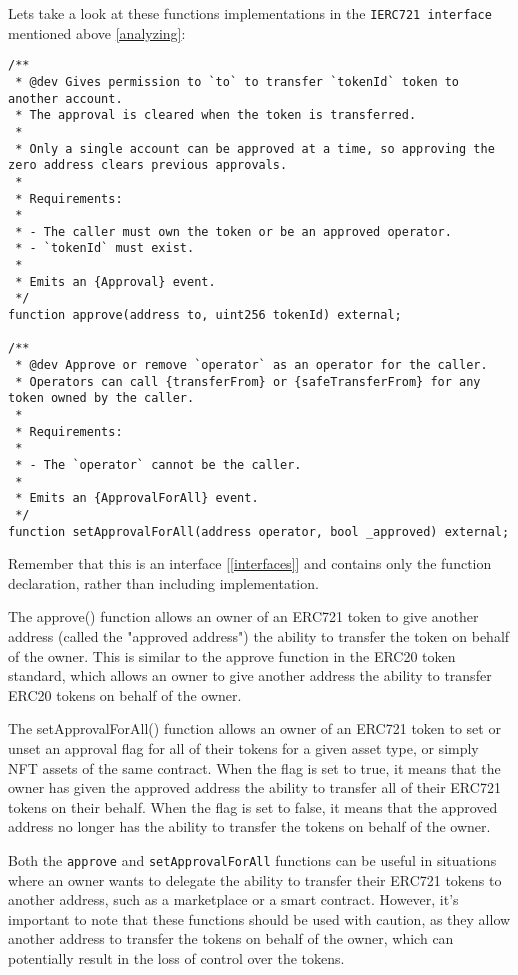 \documentclass{article}
\theoremstyle{theorem}
\theoremstyle{definition}
\theoremstyle{remark}
\begin{document}
\medskip\noindent
Lets take a look at these functions implementations in the \texttt{IERC721 interface} mentioned above \ref{analyzing}:

\begin{itemize}
\begin{lstlisting}
/**
 * @dev Gives permission to `to` to transfer `tokenId` token to another account.
 * The approval is cleared when the token is transferred.
 *
 * Only a single account can be approved at a time, so approving the zero address clears previous approvals.
 *
 * Requirements:
 *
 * - The caller must own the token or be an approved operator.
 * - `tokenId` must exist.
 *
 * Emits an {Approval} event.
 */
function approve(address to, uint256 tokenId) external;

/**
 * @dev Approve or remove `operator` as an operator for the caller.
 * Operators can call {transferFrom} or {safeTransferFrom} for any token owned by the caller.
 *
 * Requirements:
 *
 * - The `operator` cannot be the caller.
 *
 * Emits an {ApprovalForAll} event.
 */
function setApprovalForAll(address operator, bool _approved) external;
\end{lstlisting}
\end{itemize}

\noindent
Remember that this is an interface [\ref{interfaces}] and contains only the function declaration, rather than including implementation.

\medskip\noindent
The \colorbox{Gainsboro!60!Lavender}{approve()} function allows an owner of an ERC721 token to give another address (called the "approved address") the ability to transfer the token on behalf of the owner. This is similar to the approve function in the ERC20 token standard, which allows an owner to give another address the ability to transfer ERC20 tokens on behalf of the owner.

\medskip\noindent
The \colorbox{Gainsboro!60!Lavender}{setApprovalForAll()} function allows an owner of an ERC721 token to set or unset an approval flag for all of their tokens for a given asset type, or simply NFT assets of the same contract. When the flag is set to true, it means that the owner has given the approved address the ability to transfer all of their ERC721 tokens on their behalf. When the flag is set to false, it means that the approved address no longer has the ability to transfer the tokens on behalf of the owner.


\medskip\noindent
Both the \texttt{approve} and \texttt{setApprovalForAll} functions can be useful in situations where an owner wants to delegate the ability to transfer their ERC721 tokens to another address, such as a marketplace or a smart contract. However, it's important to note that these functions should be used with caution, as they allow another address to transfer the tokens on behalf of the owner, which can potentially result in the loss of control over the tokens.
\end{document}
